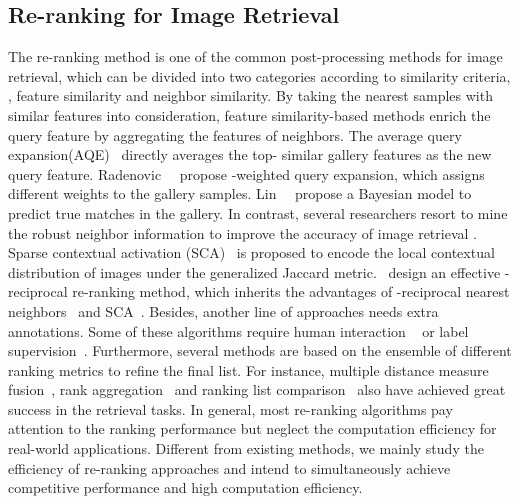 \documentclass[10pt,twocolumn,letterpaper]{article}
\begin{document}
\subsection{Re-ranking for Image Retrieval} 
The re-ranking method is one of the common post-processing methods for image retrieval, which can be divided into two categories according to similarity criteria, \ie, feature similarity and neighbor similarity. By taking the nearest samples with similar features into consideration, feature similarity-based methods enrich the query feature by aggregating the features of neighbors. The average query expansion(AQE)~\cite{chum2007total} 
directly averages the top- similar gallery features as the new query feature. Radenovic~\etal~\cite{radenovic2018fine} propose -weighted query expansion, which assigns different weights to the gallery samples. Lin~\etal~\cite{lin2020bayesian} propose a Bayesian model to predict true matches in the gallery. 
In contrast, several researchers resort to mine the robust neighbor information to improve the accuracy of image retrieval 
\cite{jegou2008accurate, bai2009learning, kontschieder2009beyond, wang2014one}.
Sparse contextual activation (SCA)~\cite{bai2016sparse} is proposed to encode the local contextual distribution of images under the generalized Jaccard metric.~\cite{zhong2017re} design an effective -reciprocal re-ranking method, which inherits the advantages of -reciprocal nearest neighbors~\cite{jegou2007contextual, qin2011hello} and SCA~\cite{bai2016sparse}.
Besides, another line of approaches needs extra annotations. Some of these algorithms require human interaction ~\cite{yamamoto2007rerank, rohini2007novel, leng2015person,liu2013pop} or label supervision~\cite{bai2017scalable}.
Furthermore, several methods are based on the ensemble of different ranking metrics to refine the final list. 
For instance, multiple distance measure fusion~\cite{zhang2012automatic, zhang2014query}, rank aggregation~\cite{pedronette2013image, pedronette2014unsupervised} and ranking list comparison~\cite{webber2010similarity} also have achieved great success in the retrieval tasks. In general, most re-ranking algorithms pay attention to the ranking performance but neglect the computation efficiency for real-world applications. 
Different from existing methods, we mainly study the efficiency of re-ranking approaches and intend to simultaneously achieve competitive performance and high computation efficiency.
\end{document}
